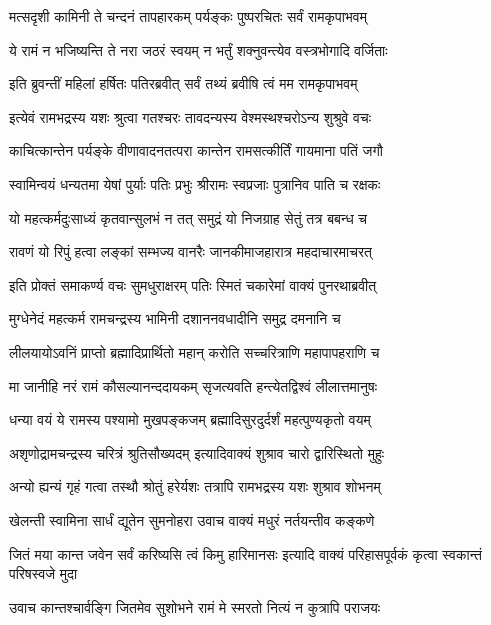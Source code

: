\twolineshloka
{मत्सदृशी कामिनी ते चन्दनं तापहारकम्}
{पर्यङ्कः पुष्परचितः सर्वं रामकृपाभवम्}%

\twolineshloka
{ये रामं न भजिष्यन्ति ते नरा जठरं स्वयम्}
{न भर्तुं शक्नुवन्त्येव वस्त्रभोगादि वर्जिताः}%

\twolineshloka
{इति ब्रुवन्तीं महिलां हर्षितः पतिरब्रवीत्}
{सर्वं तथ्यं ब्रवीषि त्वं मम रामकृपाभवम्}%

\twolineshloka
{इत्येवं रामभद्रस्य यशः श्रुत्वा गतश्चरः}
{तावदन्यस्य वेश्मस्थश्चरोऽन्य शुश्रुवे वचः}%

\twolineshloka
{काचित्कान्तेन पर्यङ्के वीणावादनतत्परा}
{कान्तेन रामसत्कीर्तिं गायमाना पतिं जगौ}%

\twolineshloka
{स्वामिन्वयं धन्यतमा येषां पुर्याः पतिः प्रभुः}
{श्रीरामः स्वप्रजाः पुत्रानिव पाति च रक्षकः}%

\twolineshloka
{यो महत्कर्मदुःसाध्यं कृतवान्सुलभं न तत्}
{समुद्रं यो निजग्राह सेतुं तत्र बबन्ध च}%

\twolineshloka
{रावणं यो रिपुं हत्वा लङ्कां सम्भज्य वानरैः}
{जानकीमाजहारात्र महदाचारमाचरत्}%

\twolineshloka
{इति प्रोक्तं समाकर्ण्य वचः सुमधुराक्षरम्}
{पतिः स्मितं चकारेमां वाक्यं पुनरथाब्रवीत्}%

\twolineshloka
{मुग्धेनेदं महत्कर्म रामचन्द्रस्य भामिनी}
{दशाननवधादीनि समुद्र दमनानि च}%

\twolineshloka
{लीलयायोऽवनिं प्राप्तो ब्रह्मादिप्रार्थितो महान्}
{करोति सच्चरित्राणि महापापहराणि च}%

\twolineshloka
{मा जानीहि नरं रामं कौसल्यानन्ददायकम्}
{सृजत्यवति हन्त्येतद्विश्वं लीलात्तमानुषः}%

\twolineshloka
{धन्या वयं ये रामस्य पश्यामो मुखपङ्कजम्}
{ब्रह्मादिसुरदुर्दर्शं महत्पुण्यकृतो वयम्}%

\twolineshloka
{अशृणोद्रामचन्द्रस्य चरित्रं श्रुतिसौख्यदम्}
{इत्यादिवाक्यं शुश्राव चारो द्वारिस्थितो मुहुः}%

\twolineshloka
{अन्यो ह्यन्यं गृहं गत्वा तस्थौ श्रोतुं हरेर्यशः}
{तत्रापि रामभद्रस्य यशः शुश्राव शोभनम्}%

\twolineshloka
{खेलन्ती स्वामिना सार्धं द्यूतेन सुमनोहरा}
{उवाच वाक्यं मधुरं नर्तयन्तीव कङ्कणे}%

\fourlineindentedshloka
{जितं मया कान्त जवेन सर्वं}
{करिष्यसि त्वं किमु हारिमानसः}
{इत्यादि वाक्यं परिहासपूर्वकं}
{कृत्वा स्वकान्तं परिषस्वजे मुदा}%

\twolineshloka
{उवाच कान्तश्चार्वङ्गि जितमेव सुशोभने}
{रामं मे स्मरतो नित्यं न कुत्रापि पराजयः}%

